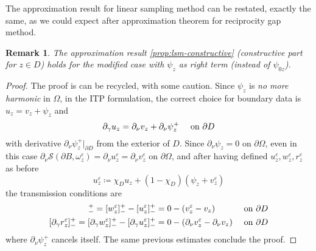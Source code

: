 \documentclass[10pt, a4paper, twoside, openright]{book}
\theoremstyle{definition}
\theoremstyle{plain}
\theoremstyle{plain}
\theoremstyle{plain}
\theoremstyle{plain}
\newtheorem{remark}[subsection]{Remark}
\theoremstyle{plain}
\theoremstyle{plain}
\theoremstyle{plain}
\theoremstyle{plain}
\let\epsilon\varepsilon
\begin{document}
The approximation result for linear sampling method can be restated, exactly the same, as we could expect after approximation theorem for reciprocity gap method.

\begin{remark}
 The approximation result \ref{prop:lsm-constructive} (constructive part for $z \in D$) holds for the modified case with $\psi_z$ as right term (instead of $\psi_{0z}$).
\end{remark}
\begin{proof}
 The proof is can be recycled, with some caution.
 Since $\psi_z$ is \emph{no more harmonic} in $\Omega$, in the ITP formulation, the correct choice for boundary data is $u_z = v_z + \psi_z$ and
 \begin{equation}
 \partial_\gamma u_z = \partial_\nu v_z + \partial_\nu\psi_z^+ \quad \textup{ on }\partial D
 \end{equation}
 with derivative $\partial_\nu\psi_z^+|_{\partial D}$ from the exterior of $D$. Since $\partial_\nu\psi_z = 0$ on $\partial \Omega$, even in this case $\partial_\nu\mathcal{S}(\partial B, \omega^\epsilon_z) = \partial_\nu u^\epsilon_z = \partial_\nu v^\epsilon_z$ on $\partial \Omega$, 
 and after having defined $u^\epsilon_z, w^\epsilon_z, r^\epsilon_z$ as before
 \begin{equation}
   u^\epsilon_z\coloneqq\chi_Du_z + (1-\chi_D)(\psi_{z} + v^\epsilon_z) 
 \end{equation}
 the transmission conditions are
  \begin{align}
   [r^\epsilon_z]^+_- = [w^\epsilon_z]^+_- -[u^\epsilon_z]^+_- &=0 - (v^\epsilon_z - v_z) && \textup{ on }\partial D \\
   [\partial_\gamma r^\epsilon_z]^+_- = [\partial_\gamma w^\epsilon_z]^+_- -[\partial_\gamma u^\epsilon_z]^+_-&= 0 - (\partial_\nu v^\epsilon_z - \partial_\nu v_z) && \textup{ on }\partial D 
  \end{align}
  where $\partial_\nu\psi_z^+$ cancels itself. The same previous estimates conclude the proof.
\end{proof}
\end{document}

